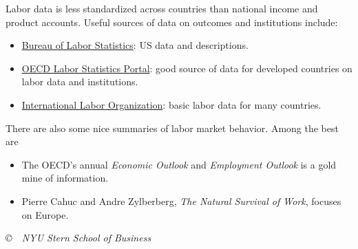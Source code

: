 \documentclass[letterpaper,12pt]{article}
\begin{document}
Labor data is less standardized across countries than national
income and product accounts.  Useful sources of data on outcomes
and institutions include:
%
\begin{itemize}
\item \href{http://www.bls.gov}{Bureau of Labor Statistics}: US
data and descriptions.

\item
\href{http://www.oecd.org/topicstatsportal/0,2647,en_2825_495670_1_1_1_1_1,00.html}
{OECD Labor Statistics Portal}:  good source of data for developed
countries on labor data and institutions.

\item \href{http://laborsta.ilo.org/}{International Labor
Organization}:  basic labor data for many countries.

\end{itemize} 
%
There are also some nice summaries of labor market behavior.
Among the best are 
\begin{itemize}
\item The OECD's annual {\it Economic Outlook\/} 
and {\it Employment Outlook\/} is a gold mine of information.

\item Pierre Cahuc and Andre Zylberberg, 
{\it The Natural Survival of Work\/}, focuses on Europe.  

\end{itemize}


\vfill \centerline{\it \copyright \ \number\year \ NYU Stern
School of Business}
\end{document}
